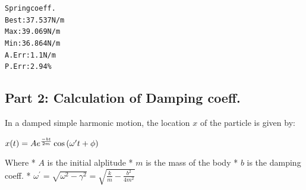\documentclass[letterpaper,10pt,english]{/usr/share/sphinx/texinputs/sphinxhowto}
\newenvironment{InvisibleVerbatim}
        {\begin{mdframed}[leftmargin=0.1\linewidth,innerleftmargin=3pt,innerrightmargin=3pt, userdefinedwidth=1\linewidth, linewidth=0pt, linecolor=white, usetwoside=false]}
        {\end{mdframed}}
\begin{document}
    

        
        

            
                \begin{InvisibleVerbatim}
                \vspace{-0.5\baselineskip}
\begin{alltt}Spring coeff.
Best:   37.537 N/m
Max:    39.069 N/m
Min:    36.864 N/m
A. Err: 1.1 N/m
P. Err: 2.94\%
\end{alltt}

            \end{InvisibleVerbatim}
            
        
    
\subsection{Part 2: Calculation of Damping
coeff.}\label{part-2-calculation-of-damping-coeff.}

In a damped simple harmonic motion, the location $x$ of the particle is
given by:

$\large  x(t) = Ae^{\frac{-bt}{2m}}\cos{(\omega^\prime t + \phi)}$

Where * $A$ is the initial alplitude * $m$ is the mass of the body * $b$
is the damping coeff. *
$\displaystyle\omega^\prime = \sqrt{\omega^2 - \gamma^2} = \sqrt{\frac{k}{m} - \frac{b^2}{4m^2}}$

\end{document}
